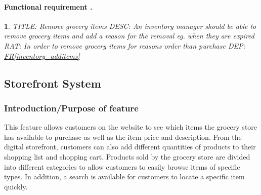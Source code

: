 \documentclass{scrreprt}
\newcounter{funcreq}
\theoremstyle{funreq}
\newtheorem{funreq}{}
\newcommand*{\reqref}[1]{\hyperref[#1]{FR\ref*{#1}}}
\begin{document}
	\paragraph[]{Functional requirement .}
	\begin{funreq}
		
		\label{inventory_remove}
		TITLE: Remove grocery items
		DESC: An inventory manager should be able to remove grocery items and add a reason for the removal eg. when they are expired
		RAT: In order to remove grocery items for reasons order than purchase
		DEP: \reqref{inventory_additems}
	\end{funreq}
	
	
	








	\subsection{Storefront System}
\subsubsection{Introduction/Purpose of feature}
This feature allows customers on the website to see which items the grocery store has available to purchase as well as the item price and description.  From the digital storefront, customers can also add different quantities of products to their shopping list and shopping cart.  Products sold by the grocery store are divided into different categories to allow customers to easily browse items of specific types.  In addition, a search is available for customers to locate a specific item quickly.
\end{document}
